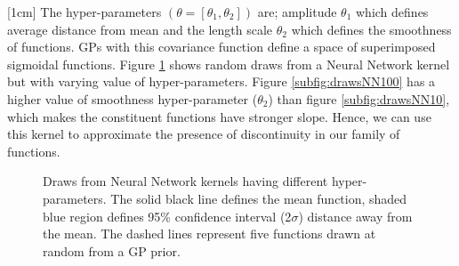 [1cm]
The hyper-parameters $(\theta = [\theta_{1}, \theta_{2}])$ are; amplitude $\theta_{1}$ which defines average distance from mean and the length scale $\theta_{2}$ which defines the smoothness of functions. GPs with this covariance function define a space of superimposed sigmoidal functions. Figure \ref{figNNPrior} shows random draws from a Neural Network kernel but with varying value of hyper-parameters. Figure \ref{subfig:drawsNN100} has a higher value of smoothness hyper-parameter ($\theta_{2}$) than figure \ref{subfig:drawsNN10}, which makes the constituent functions have stronger slope. Hence, we can use this kernel to approximate the presence of discontinuity in our family of functions. 

\begin{figure}[!ht]
  \centering
  \quad
    \quad
  \caption{Draws from Neural Network kernels having different hyper-parameters. The solid black line defines the mean function, shaded blue region defines 95\% confidence interval (2$\sigma$) distance away from the mean. The dashed lines represent five functions drawn at random from a GP prior.}
  \label{figNNPrior}
\end{figure}

